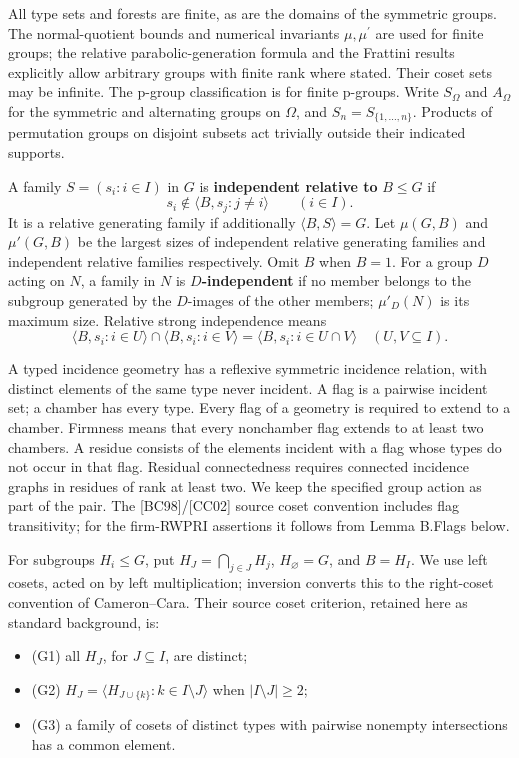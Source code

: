 \documentclass[
  11pt,
  a4paper,
]{article}
\providecommand{\tightlist}{%
  \setlength{\itemsep}{0pt}\setlength{\parskip}{0pt}}
\begin{document}
All type sets and forests are finite, as are the domains of the
symmetric groups. The normal-quotient bounds and numerical invariants
\(\mu,\mu^{\prime}\) are used for finite groups; the relative
parabolic-generation formula and the Frattini results explicitly allow
arbitrary groups with finite rank where stated. Their coset sets may be
infinite. The p-group classification is for finite p-groups. Write
\(S_\Omega\) and \(A_\Omega\) for the symmetric and alternating groups
on \(\Omega\), and \(S_n=S_{\{1,\ldots,n\}}\). Products of permutation
groups on disjoint subsets act trivially outside their indicated
supports.

A family \(S=(s_i:i\in I)\) in \(G\) is \textbf{independent relative to}
\(B\leq G\) if \[
s_i\notin\langle B,s_j:j\ne i\rangle\qquad(i\in I).
\] It is a relative generating family if additionally
\(\langle B,S\rangle=G\). Let \(\mu(G,B)\) and \(\mu'(G,B)\) be the
largest sizes of independent relative generating families and
independent relative families respectively. Omit \(B\) when \(B=1\). For
a group \(D\) acting on \(N\), a family in \(N\) is
\textbf{\(D\)-independent} if no member belongs to the subgroup
generated by the \(D\)-images of the other members; \(\mu'_D(N)\) is its
maximum size. Relative strong independence means \[
\langle B,s_i:i\in U\rangle\cap\langle B,s_i:i\in V\rangle
 =\langle B,s_i:i\in U\cap V\rangle \quad(U,V\subseteq I).
\tag{1.1}
\]

A typed incidence geometry has a reflexive symmetric incidence relation,
with distinct elements of the same type never incident. A flag is a
pairwise incident set; a chamber has every type. Every flag of a
geometry is required to extend to a chamber. Firmness means that every
nonchamber flag extends to at least two chambers. A residue consists of
the elements incident with a flag whose types do not occur in that flag.
Residual connectedness requires connected incidence graphs in residues
of rank at least two. We keep the specified group action as part of the
pair. The {[}BC98{]}/{[}CC02{]} source coset convention includes flag
transitivity; for the firm-RWPRI assertions it follows from Lemma
B.Flags below.

For subgroups \(H_i\leq G\), put \(H_J=\bigcap_{j\in J}H_j\),
\(H_\varnothing=G\), and \(B=H_I\). We use left cosets, acted on by left
multiplication; inversion converts this to the right-coset convention of
Cameron--Cara. Their source coset criterion, retained here as standard
background, is:

\begin{itemize}
\tightlist
\item
  (G1) all \(H_J\), for \(J\subseteq I\), are distinct;
\item
  (G2) \(H_J=\langle H_{J\cup\{k\}}:k\in I\setminus J\rangle\) when
  \(|I\setminus J|\geq2\);
\item
  (G3) a family of cosets of distinct types with pairwise nonempty
  intersections has a common element.
\end{itemize}
\end{document}
